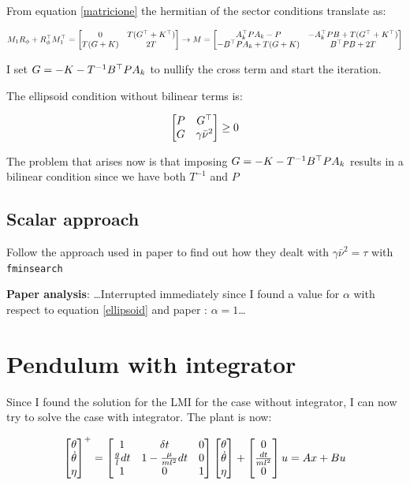 \documentclass{article}
\begin{document}
From equation \ref{matricione} the hermitian of the sector conditions translate as:

\begin{equation}
  M_1 R_{\phi} + R_{\phi}^\top M_1^\top = \left[\begin{matrix}
    0 & T(G^\top + K^\top)\\
    T(G + K) & 2T
  \end{matrix}\right]  \to M = \left[\begin{matrix}
    A_k^\top P A_k - P & -A_k^\top P B + T(G^\top + K^\top)\\
    -B^\top P A_k + T(G + K) & B^\top P B + 2T
  \end{matrix}\right]
\end{equation}

I set $G = -K - T^{-1} B^\top P A_k$ to nullify the cross term and start the iteration.

The ellipsoid condition without bilinear terms is:

\begin{equation}
  \left[\begin{matrix}
    P & G^\top \\
    G & \gamma \bar{\nu}^{2}
  \end{matrix}\right] \geq 0
\end{equation}

The problem that arises now is that imposing $G = -K - T^{-1} B^\top P A_k$ results in a bilinear condition since we have both $T^{-1}$ and $P$

\subsection*{Scalar approach}

Follow the approach used in paper \cite{isabelle-paper} to find out how they dealt with $\gamma \bar{\nu}^{2} = \tau$ with \texttt{fminsearch}

\textbf{Paper analysis}: \dots Interrupted immediately since I found a value for $\alpha$ with respect to equation \ref{ellipsoid} and paper \cite{css-extended}: $\alpha = 1$\dots

\section*{Pendulum with integrator}
Since I found the solution for the LMI for the case without integrator, I can now try to solve the case with integrator. The plant is now:

\begin{equation}
  \left[\begin{matrix}
  \theta \\
  \dot{\theta} \\
  \eta
  \end{matrix}\right]^{+} = \left[\begin{matrix}
  1 & \delta t & 0\\
  \frac{g}{l} dt & 1 - \frac{\mu}{m l^2} dt & 0\\
  1 & 0 & 1
  \end{matrix}\right] \left[\begin{matrix}
  \theta \\
  \dot{\theta} \\
  \eta
  \end{matrix}\right] + \left[\begin{matrix}
    0 \\
    \frac{dt}{m l^2} \\
    0
  \end{matrix}\right] u = A x + B u
\end{equation}
\end{document}
